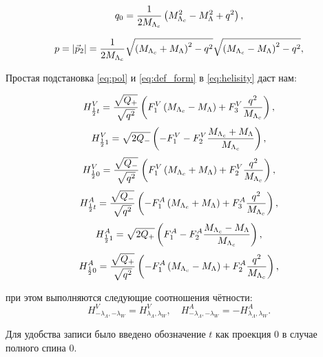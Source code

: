 \begin{equation}
    q_0 = \frac{1}{2 M_{\Lambda_c}} \left(  M_{\Lambda_c}^2 - M_{\Lambda}^2 + q^2  \right),
\end{equation}
 
\begin{equation}
p = \abs{\vec{p}_2} = \frac{1}{2 M_{\Lambda_c}} \sqrt{\left(  M_{\Lambda_c} + M_{\Lambda}  \right)^2 - q^2} \sqrt{\left(  M_{\Lambda_c} - M_{\Lambda}  \right)^2 - q^2},
\end{equation}
 
Простая подстановка \ref{eq:pol} и \ref{eq:def_form} в \ref{eq:helisity} даст нам:
 
\begin{equation}
H^{V}_{\frac{1}{2}t} = \frac{\sqrt{Q_+}}{\sqrt{q^2}} \left(  F_1^V \left(  M_{\Lambda_c} - M_{\Lambda}  \right) + F_3^V \frac{q^2}{M_{\Lambda_c}}  \right),
\end{equation}
\begin{equation}
H^{V}_{\frac{1}{2}1} = \sqrt{2Q_-} \left(  - F_1^V - F_2^V \frac{M_{\Lambda_c} + M_{\Lambda}}{M_{\Lambda_c}}  \right),
\end{equation}
\begin{equation}
H^{V}_{\frac{1}{2}0} = \frac{\sqrt{Q_-}}{\sqrt{q^2}} \left(  F_1^V \left(  M_{\Lambda_c} + M_{\Lambda}  \right) + F_2^V \frac{q^2}{M_{\Lambda_c}}  \right),
\end{equation}
\begin{equation}
H^{A}_{\frac{1}{2}t} = \frac{\sqrt{Q_-}}{\sqrt{q^2}} \left(  - F_1^A \left(  M_{\Lambda_c} + M_{\Lambda}  \right) + F_3^A \frac{q^2}{M_{\Lambda_c}}  \right),
\end{equation}
\begin{equation}
H^{A}_{\frac{1}{2}1} = \sqrt{2Q_+} \left(  F_1^A - F_2^A \frac{M_{\Lambda_c} - M_{\Lambda}}{M_{\Lambda_c}}  \right),
\end{equation}
\begin{equation}
H^{A}_{\frac{1}{2}0} = \frac{\sqrt{Q_+}}{\sqrt{q^2}} \left(  - F_1^A \left(  M_{\Lambda_c} - M_{\Lambda}  \right) + F_2^A \frac{q^2}{M_{\Lambda_c}}  \right),
\end{equation}
 
при этом выполняются следующие соотношения чётности:
\begin{equation}
H^{V}_{-\lambda_\Lambda,-\lambda_W} = H^{V}_{\lambda_\Lambda,\lambda_W}, \quad
H^{A}_{-\lambda_\Lambda,-\lambda_W} = - H^{A}_{\lambda_\Lambda,\lambda_W}.
\end{equation}
 
Для удобства записи было введено обозначение $t$ как проекция 0 в случае полного спина 0.